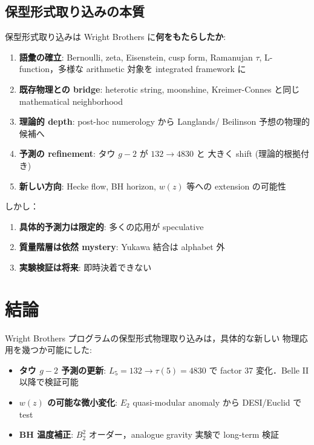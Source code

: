 \documentclass[11pt,a4paper]{article}
\begin{document}
\subsection{保型形式取り込みの本質}

保型形式取り込みは Wright Brothers に\textbf{何をもたらしたか}:

\begin{enumerate}
\item \textbf{語彙の確立}: Bernoulli, zeta, Eisenstein, cusp form,
Ramanujan $\tau$, L-function，多様な arithmetic 対象を integrated
framework に
\item \textbf{既存物理との bridge}: heterotic string, moonshine,
Kreimer-Connes と同じ mathematical neighborhood
\item \textbf{理論的 depth}: post-hoc numerology から Langlands/
Beilinson 予想の物理的候補へ
\item \textbf{予測の refinement}: タウ $g-2$ が $132 \to 4830$ と
大きく shift (理論的根拠付き)
\item \textbf{新しい方向}: Hecke flow, BH horizon, $w(z)$ 等への
extension の可能性
\end{enumerate}

しかし：

\begin{enumerate}
\item \textbf{具体的予測力は限定的}: 多くの応用が speculative
\item \textbf{質量階層は依然 mystery}: Yukawa 結合は alphabet 外
\item \textbf{実験検証は将来}: 即時決着できない
\end{enumerate}

\section{結論}

Wright Brothers プログラムの保型形式物理取り込みは，具体的な新しい
物理応用を幾つか可能にした:

\begin{itemize}
\item \textbf{タウ $g-2$ 予測の更新}: $L_5 = 132 \to \tau(5) = 4830$ で
factor 37 変化．Belle II 以降で検証可能
\item \textbf{$w(z)$ の可能な微小変化}: $E_2$ quasi-modular anomaly
から DESI/Euclid で test
\item \textbf{BH 温度補正}: $B_2^2$ オーダー，analogue gravity 実験で
long-term 検証
\end{itemize}
\end{document}
